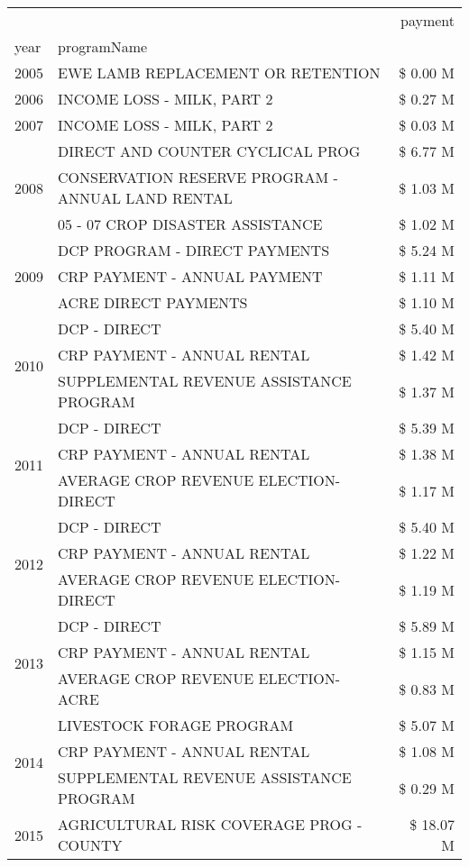 \begin{tabular}{llr}
\toprule
 &  & payment \\
year & programName &  \\
\midrule
2005 & EWE LAMB REPLACEMENT OR RETENTION & \$ 0.00 M \\
\cline{1-3}
2006 & INCOME LOSS - MILK, PART 2 & \$ 0.27 M \\
\cline{1-3}
2007 & INCOME LOSS - MILK, PART 2 & \$ 0.03 M \\
\cline{1-3}
\multirow[t]{3}{*}{2008} & DIRECT AND COUNTER CYCLICAL PROG & \$ 6.77 M \\
 & CONSERVATION RESERVE PROGRAM - ANNUAL LAND RENTAL & \$ 1.03 M \\
 & 05 - 07 CROP DISASTER ASSISTANCE & \$ 1.02 M \\
\cline{1-3}
\multirow[t]{3}{*}{2009} & DCP PROGRAM - DIRECT PAYMENTS & \$ 5.24 M \\
 & CRP PAYMENT - ANNUAL PAYMENT & \$ 1.11 M \\
 & ACRE DIRECT PAYMENTS & \$ 1.10 M \\
\cline{1-3}
\multirow[t]{3}{*}{2010} & DCP - DIRECT & \$ 5.40 M \\
 & CRP PAYMENT - ANNUAL RENTAL & \$ 1.42 M \\
 & SUPPLEMENTAL REVENUE ASSISTANCE PROGRAM & \$ 1.37 M \\
\cline{1-3}
\multirow[t]{3}{*}{2011} & DCP - DIRECT & \$ 5.39 M \\
 & CRP PAYMENT - ANNUAL RENTAL & \$ 1.38 M \\
 & AVERAGE CROP REVENUE ELECTION-DIRECT & \$ 1.17 M \\
\cline{1-3}
\multirow[t]{3}{*}{2012} & DCP - DIRECT & \$ 5.40 M \\
 & CRP PAYMENT - ANNUAL RENTAL & \$ 1.22 M \\
 & AVERAGE CROP REVENUE ELECTION-DIRECT & \$ 1.19 M \\
\cline{1-3}
\multirow[t]{3}{*}{2013} & DCP - DIRECT & \$ 5.89 M \\
 & CRP PAYMENT - ANNUAL RENTAL & \$ 1.15 M \\
 & AVERAGE CROP REVENUE ELECTION-ACRE & \$ 0.83 M \\
\cline{1-3}
\multirow[t]{3}{*}{2014} & LIVESTOCK FORAGE PROGRAM & \$ 5.07 M \\
 & CRP PAYMENT - ANNUAL RENTAL & \$ 1.08 M \\
 & SUPPLEMENTAL REVENUE ASSISTANCE PROGRAM & \$ 0.29 M \\
\cline{1-3}
\multirow[t]{3}{*}{2015} & AGRICULTURAL RISK COVERAGE PROG - COUNTY & \$ 18.07 M \\

\end{tabular}
